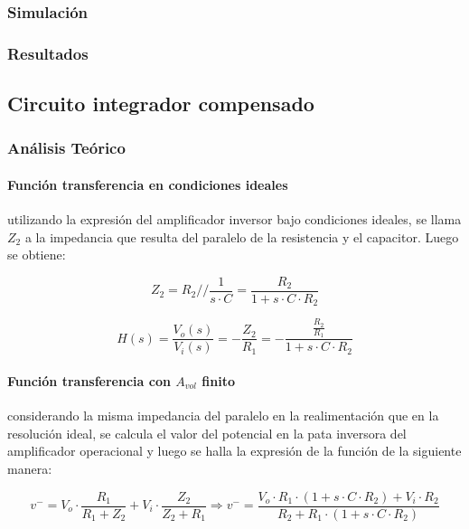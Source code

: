 \subsubsection{Simulaci\'on}
\subsubsection{Resultados}

	\subsection{Circuito integrador compensado}

\subsubsection{An\'alisis Te\'orico}

\paragraph*{Funci\'on transferencia en condiciones ideales} utilizando la expresi\'on del amplificador inversor bajo condiciones ideales, se llama $Z_2$ a la impedancia que resulta del paralelo de la resistencia y el capacitor. Luego se obtiene:

\begin{equation*}
	Z_2 = R_2 // \frac{1}{s \cdot C} = \frac{R_2}{1 + s \cdot C \cdot R_2}
\end{equation*}

\begin{equation}
	H(s) = \frac{V_o(s)}{V_i(s)} = - \frac{Z_2}{R_1} = - \frac{\frac{R_2}{R_1}}{1 + s \cdot C \cdot R_2}
	\label{eq:integrador_compensado_transfer_ideal}
\end{equation}

\paragraph*{Funci\'on transferencia con $A_{vol}$ finito} considerando la misma impedancia del paralelo en la realimentaci\'on que en la resoluci\'on ideal, se calcula el valor del potencial en la pata inversora del amplificador operacional y luego se halla la expresi\'on de la funci\'on de la siguiente manera:

\begin{equation*}
	v^{-} = V_o \cdot \frac{R_1}{R_1+ Z_2} + V_i \cdot \frac{Z_2}{Z_2 + R_1} \Rightarrow
	v^{-} = \frac{V_o \cdot R_1 \cdot ( 1 + s \cdot C \cdot R_2) + V_i \cdot R_2}{R_2 + R_1 \cdot (1 + s \cdot C \cdot R_2)}
\end{equation*}

